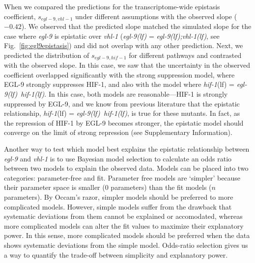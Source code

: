 \documentclass[9pt,twocolumn,twoside]{pnas-new}
\newcommand{\gene}[1]{\emph{#1}}
\newcommand{\egl}{\emph{\mbox{egl-9}(lf)}}
\newcommand{\eglvhl}{\emph{\mbox{egl-9(lf);vhl-1(lf)}}}
\newcommand{\eglhif}{\emph{\mbox{egl-9(lf)}~\mbox{hif-1(lf)}}}
\newcommand{\hif}{\emph{\mbox{hif-1}}(lf)}
\newcommand{\eglp}{EGL-9}
\newcommand{\hifp}{HIF-1}
\begin{document}
When we compared the predictions for the transcriptome-wide epistasis coefficient,
$s_{egl-9,vhl-1}$ under different assumptions with the observed slope ($-0.42$). We
observed that the predicted slope matched the simulated slope for the case where
\gene{egl-9} is epistatic over \gene{vhl-1} (\egl{} = \eglvhl{}, see
Fig.~\ref{fig:egl9epistasis}) and did not overlap with any other prediction.
Next, we predicted the distribution of $s_{egl-9,hif-1}$ for different pathways
and contrasted with the observed slope. In this case, we saw that the uncertainty
in the observed coefficient overlapped significantly with the strong suppression
model, where \eglp{} strongly suppresses \hifp{}, and also with the model where
\hif{} = \eglhif{}. In this case, both models are reasonable---\hifp{} is strongly
suppressed by \eglp{}, and we know from previous literature that the epistatic
relationship, \hif{} = \eglhif{}, is true for these mutants. In fact, as the
repression of \hifp{} by \eglp{} becomes stronger, the epistatic model should converge
on the limit of strong repression (see Supplementary Information).

Another way to test which model best explains the epistatic relationship between
\gene{egl-9} and \gene{vhl-1} is to use Bayesian model selection to calculate
an odds ratio between two models to explain the observed data. Models can be placed
into two categories: parameter-free and fit. Parameter free models are `simpler'
because their parameter space is smaller (0 parameters) than the fit models ($n$
parameters). By Occam's razor, simpler models should be preferred to more
complicated models. However, simple models suffer from the drawback that
systematic deviations from them cannot be explained or accomodated, whereas more
complicated models can alter the fit values to maximize their explanatory power.
In this sense, more complicated models should be preferred when the data shows
systematic deviations from the simple model. Odds-ratio selection gives us a way
to quantify the trade-off between simplicity and explanatory power.
\end{document}
